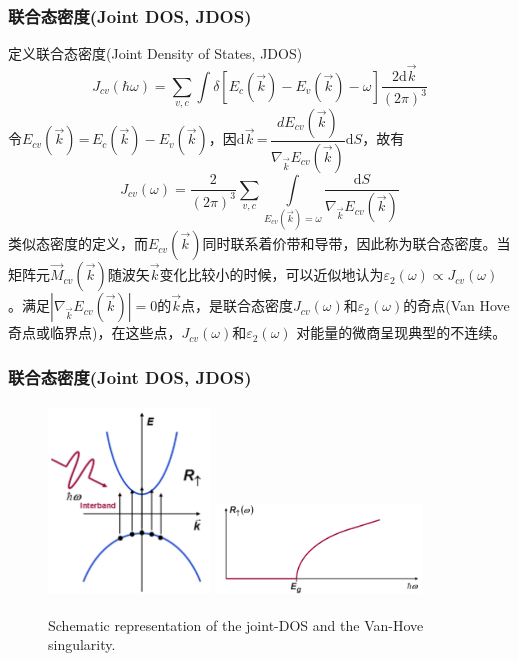 \frame
{
	\frametitle{联合态密度\textrm{(Joint DOS, JDOS)}}
定义联合态密度(\textrm{Joint Density of States, JDOS})
\begin{displaymath}
  J_{cv}(\hbar\omega)=\sum_{v,c}\int\delta[E_c(\vec k)-E_v(\vec k)-\omega]\frac{2\textrm{d}\vec k}{(2\pi)^3}
  \label{eq:optic-33}
\end{displaymath}
令$E_{cv}(\vec k)$\,=\,$E_c(\vec k)-E_v(\vec k)$，因$\textrm{d}\vec k$\,=\,$\dfrac{dE_{cv}(\vec k)}{\nabla_{\vec k}E_{cv}(\vec k)}\textrm{d}S$，故有
\begin{displaymath}
  J_{cv}(\omega)=\frac2{(2\pi)^3}\sum_{v,c}\int\limits_{E_{cv}(\vec k)=\omega}\frac{\textrm{d}S}{\nabla_{\vec k}E_{cv}(\vec k)}
  \label{eq:optic-34}
\end{displaymath}
类似态密度的定义，而$E_{cv}(\vec k)$同时联系着价带和导带，因此称为联合态密度。当矩阵元$\vec M_{cv}(\vec k)$随波矢$\vec k$变化比较小的时候，可以近似地认为$\varepsilon_2(\omega)\!\propto\!J_{cv}(\omega)$。满足$|\nabla_{\vec k}E_{cv}(\vec k)|\!=\!0$的$\vec k$点，是联合态密度$J_{cv}(\omega)$和$\varepsilon_2(\omega)$的奇点(\textrm{Van Hove}奇点或临界点)，在这些点，$J_{cv}(\omega)$和$\varepsilon_2(\omega)$%
对能量的微商呈现典型的不连续。%
}

\frame
{
	\frametitle{联合态密度\textrm{(Joint DOS, JDOS)}}
\begin{figure}[h!]
\centering
\vspace*{-0.05in}
\includegraphics[height=2.0in,width=1.7in,viewport=0 0 630 760,clip]{Figures/Inter_band-transition_R.png}
\includegraphics[height=1.0in,width=2.15in,viewport=0 0 1320 580,clip]{Figures/Inter_band-transition_JDOS.png}
\caption{\fontsize{5.2pt}{4.0pt}\selectfont\textrm{Schematic representation of the joint-DOS and the Van-Hove singularity.}}%
\label{Optic-JDOS}
\end{figure} 
}

